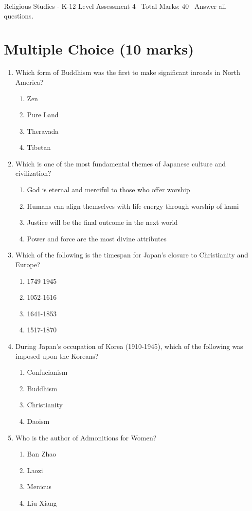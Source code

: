 \documentclass[12pt]{article}
\begin{document}
\begin{center}
Religious Studies - K-12 Level Assessment 4 \
Total Marks: 40 \
Answer all questions.
\end{center}

\section*{Multiple Choice (10 marks)}
\begin{enumerate}[label=\arabic*.]
\item Which form of Buddhism was the first to make significant inroads in North America?
\begin{enumerate}[label=(\alph*)]
    \item Zen
    \item Pure Land
    \item Theravada
    \item Tibetan
\end{enumerate}
\item Which is one of the most fundamental themes of Japanese culture and civilization?
\begin{enumerate}[label=(\alph*)]
    \item God is eternal and merciful to those who offer worship
    \item Humans can align themselves with life energy through worship of kami
    \item Justice will be the final outcome in the next world
    \item Power and force are the most divine attributes
\end{enumerate}
\item Which of the following is the timespan for Japan's closure to Christianity and Europe?
\begin{enumerate}[label=(\alph*)]
    \item 1749-1945
    \item 1052-1616
    \item 1641-1853
    \item 1517-1870
\end{enumerate}
\item During Japan's occupation of Korea (1910-1945), which of the following was imposed upon the Koreans?
\begin{enumerate}[label=(\alph*)]
    \item Confucianism
    \item Buddhism
    \item Christianity
    \item Daoism
\end{enumerate}
\item Who is the author of Admonitions for Women?
\begin{enumerate}[label=(\alph*)]
    \item Ban Zhao
    \item Laozi
    \item Menicus
    \item Liu Xiang
\end{enumerate}
\end{enumerate}
\end{document}

